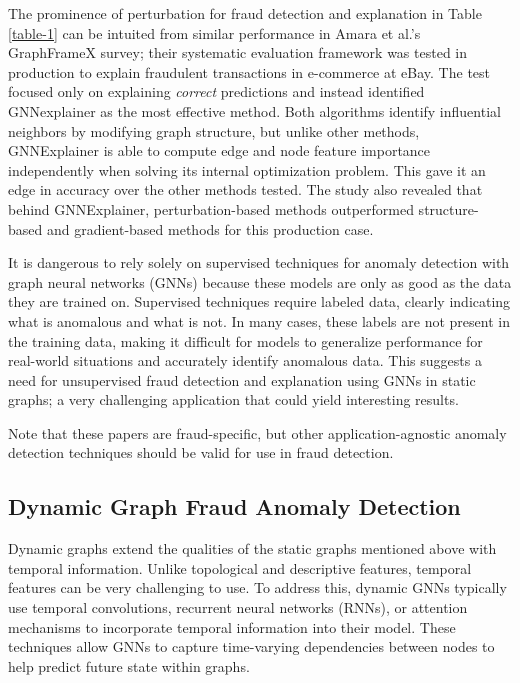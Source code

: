 The prominence of perturbation for fraud detection and explanation in Table \ref{table-1} can be intuited from similar performance in Amara et al.\cite{amara_graphframex_2022}'s GraphFrameX survey; their systematic evaluation framework was tested in production to explain fraudulent transactions in e-commerce at eBay. The test focused only on explaining \textit{correct} predictions and instead identified GNNexplainer as the most effective method. Both algorithms identify influential neighbors by modifying graph structure, but unlike other methods, GNNExplainer is able to compute edge and node feature importance independently when solving its internal optimization problem. This gave it an edge in accuracy over the other methods tested. The study also revealed that behind GNNExplainer, perturbation-based methods outperformed structure-based and gradient-based methods for this production case. 

It is dangerous to rely solely on supervised techniques for anomaly detection with graph neural networks (GNNs) because these models are only as good as the data they are trained on. Supervised techniques require labeled data, clearly indicating what is anomalous and what is not. In many cases, these labels are not present in the training data, making it difficult for models to generalize performance for real-world situations and accurately identify anomalous data. This suggests a need for unsupervised fraud detection and explanation using GNNs in static graphs; a very challenging application that could yield interesting results.

Note that these papers are fraud-specific, but other application-agnostic anomaly detection techniques should be valid for use in fraud detection.

\subsection{Dynamic Graph Fraud Anomaly Detection}
Dynamic graphs extend the qualities of the static graphs mentioned above with temporal information. Unlike topological and descriptive features, temporal features can be very challenging to use. To address this, dynamic GNNs typically use temporal convolutions, recurrent neural networks (RNNs), or attention mechanisms to incorporate temporal information into their model\cite{ma_comprehensive_2021}. These techniques allow GNNs to capture time-varying dependencies between nodes to help predict future state within graphs.

